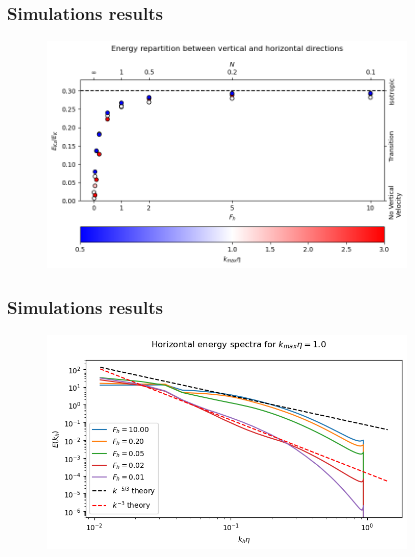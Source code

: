 \documentclass{beamer}
\begin{document}
\begin{frame}
\frametitle{Simulations results}

\begin{figure}
	\centering
	\includegraphics[width=0.85\textwidth]{fig/kz_kh.png}
\end{figure}

\end{frame}


\begin{frame}
\frametitle{Simulations results}

\begin{figure}
	\centering
	\includegraphics[width=0.85\textwidth]{fig/multi_Ekh_kh.png}
\end{figure}

\end{frame}
\end{document}
